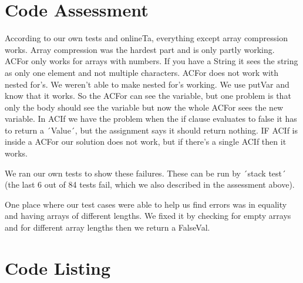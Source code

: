 \documentclass[12pt,a4paper]{article}
\begin{document}
\section{Code Assessment}
According to our own tests and onlineTa, everything except array compression works.
Array compression was the hardest part and is only partly working. ACFor only works for arrays with numbers. If you have a String it sees the string as only one element and not multiple characters. ACFor does not work with nested for's. We weren't able to make nested for's working. We use putVar and know that it works. So the ACFor can see the variable, but one problem is that only the body should see the variable but now the whole ACFor sees the new variable.
In ACIf we have the problem when the if clause evaluates to false it has to return a ´Value´, but the assignment says it should return nothing. IF ACIf is inside a ACFor our solution does not work, but if there's a single ACIf then it works.

We ran our own tests to show these failures. These can be run by ´stack test´ (the last 6 out of 84 tests fail, which we also described in the assessment above). 

One place where our test cases were able to help us find errors was in equality and having arrays of different lengths. We fixed it by checking for empty arrays and for different array lengths then  we return a FalseVal.

\appendix
\section{Code Listing}

\inputminted{haskell}{handin/src/SubsInterpreter.hs}
\end{document}
